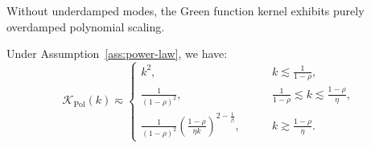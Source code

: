 Without underdamped modes, the Green function kernel exhibits purely overdamped polynomial scaling.

\begin{lemma}
\label{lem:pol_kernel0}
Under Assumption~\ref{ass:power-law}, we have:
\begin{equation*}
    \mathcal{K}_{\mathrm{Pol}}(k)
    \eqsim \begin{cases}
    k^2, &\qquad k\lesssim \frac{1}{1-\rho},\\
    \frac{1}{(1-\rho)^2}, &\qquad \frac{1}{1-\rho}\lesssim k \lesssim \frac{1-\rho}{\eta},\\
    \frac{1}{(1-\rho)^2}
    \left(\frac{1-\rho}{\eta k}\right)^{2-\frac1\beta}, &\qquad k \gtrsim  \frac{1-\rho}{\eta}.
\end{cases}
\end{equation*}
\end{lemma}

